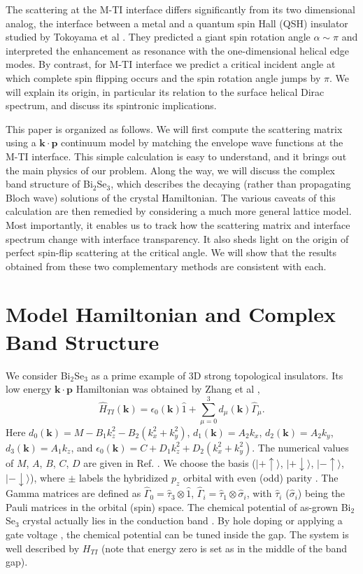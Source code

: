 \documentclass[11pt]{report}
\def\v#1{\mathbf{#1}}
\def\ket#1{\vert #1 \rangle}
\begin{document}
The scattering at the M-TI interface differs significantly from its two dimensional analog, the interface between a metal and a quantum spin Hall (QSH) insulator studied by Tokoyama et al \cite{yokoyama09}. They predicted a giant spin rotation angle $\alpha\sim \pi$ and interpreted the enhancement as resonance with the one-dimensional helical edge modes. By contrast, for M-TI interface we predict a critical incident angle at which complete spin flipping occurs and the spin rotation angle jumps by $\pi$. We will explain its origin, {in particular its relation to the surface helical Dirac spectrum}, and discuss its spintronic implications.

This paper is organized as follows. 
We will first compute the scattering matrix using a $\mathbf{k\cdot p}$ continuum model 
by matching the envelope wave functions at the M-TI interface. This simple calculation is easy to understand, 
and it brings out
the main physics of our problem. Along the way, we will discuss the complex band structure of Bi$_2$Se$_3$,
 which describes the decaying (rather than propagating Bloch wave) solutions of the crystal Hamiltonian.
The various caveats of this calculation 
are then remedied by considering a much more general lattice model. Most importantly, it enables us to 
track how the scattering matrix and interface spectrum change with interface transparency. It also sheds light on
the origin of perfect spin-flip scattering at the critical angle.
We will show that the results obtained from these two complementary methods are consistent with each.

\section{Model Hamiltonian and Complex Band Structure}

We consider Bi$_2$Se$_3$ as a prime example of 3D strong topological insulators. Its low energy $\mathbf{k\cdot p}$ Hamiltonian was obtained by Zhang et al \cite{zhang2009},
\[
\hat{H}_{TI}(\v{k})=\epsilon_0(\v{k})\hat{1}+\sum_{\mu=0}^{3}d_\mu(\v{k})\hat{\Gamma}_\mu.
\]
Here $d_0(\v{k})=M-B_1k^2_z-B_2(k_x^2+k_y^2)$, $d_1(\v{k})=A_2 k_x$, $d_2(\v{k})=A_2 k_y$, $d_3(\v{k})=A_1 k_z$, and $\epsilon_0(\v{k})=C+D_1k_z^2+D_2(k_x^2+k_y^2)$. The numerical values of $M$, $A$, $B$, $C$, $D$ are given in Ref. 
\cite{zhang2009}.
We choose the basis ($\ket{+\uparrow}$, $\ket{+\downarrow}$, $\ket{-\uparrow}$,$\ket{-\downarrow}$), where $\pm$ labels the hybridized $p_z$ orbital with even (odd) parity \cite{zhang2009}. The Gamma matrices are defined as
$\hat{\Gamma}_0=\hat{\tau}_3\otimes \hat{1}$, $\hat{\Gamma}_i=\hat{\tau}_1\otimes \hat{\sigma}_i$, with
$\hat{\tau}_i$ ($\hat{\sigma}_i$) being the Pauli matrices in the orbital (spin) space.
The chemical potential of as-grown Bi$_2$Se$_3$ crystal actually lies in the conduction 
band \cite{Hsieh2009}. By hole doping \cite{Hsieh2009} 
or applying a gate voltage \cite{gate}, the chemical potential can be tuned inside 
the gap. The system is well described by $H_{TI}$ (note that energy zero is set as 
in the middle of the band gap).
\end{document}
